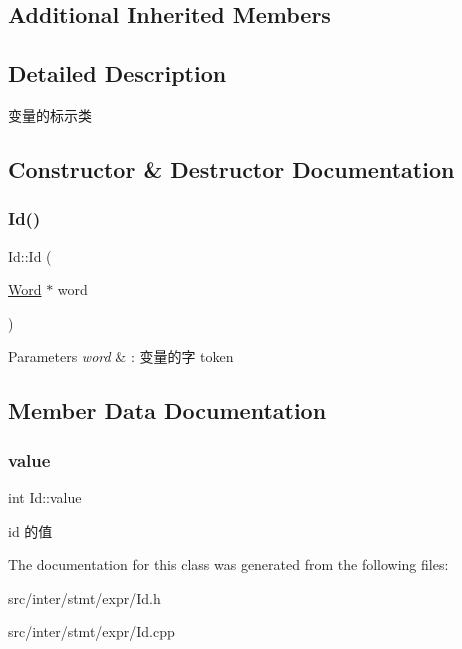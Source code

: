 \subsection*{Additional Inherited Members}


\subsection{Detailed Description}
变量的标示类 

\subsection{Constructor \& Destructor Documentation}
\mbox{\label{class_id_a22122a40c4a61b6d2f7d20a3cc7c7275}} 
\subsubsection{\texorpdfstring{Id()}{Id()}}
{\footnotesize\ttfamily Id\+::\+Id (\begin{DoxyParamCaption}\item[{\hyperlink{class_word}{Word} $\ast$}]{word }\end{DoxyParamCaption})}


\begin{DoxyParams}{Parameters}
{\em word} & \+: 变量的字 token \\
\hline
\end{DoxyParams}


\subsection{Member Data Documentation}
\mbox{\label{class_id_af7f7ed479b45ce150b88481b7b996e32}} 
\subsubsection{\texorpdfstring{value}{value}}
{\footnotesize\ttfamily int Id\+::value}

id 的值 

The documentation for this class was generated from the following files\+:\begin{DoxyCompactItemize}
\item 
src/inter/stmt/expr/Id.\+h\item 
src/inter/stmt/expr/Id.\+cpp\end{DoxyCompactItemize}
